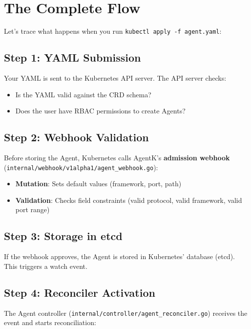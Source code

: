 \documentclass[12pt,a4paper,openany]{report}
\begin{document}
\section{The Complete Flow}

Let's trace what happens when you run \texttt{kubectl apply -f agent.yaml}:

\subsection{Step 1: YAML Submission}

Your YAML is sent to the Kubernetes API server. The API server checks:
\begin{itemize}
    \item Is the YAML valid against the CRD schema?
    \item Does the user have RBAC permissions to create Agents?
\end{itemize}

\subsection{Step 2: Webhook Validation}

Before storing the Agent, Kubernetes calls AgentK's \textbf{admission webhook} (\texttt{internal/webhook/v1alpha1/agent\_webhook.go}):

\begin{itemize}
    \item \textbf{Mutation}: Sets default values (framework, port, path)
    \item \textbf{Validation}: Checks field constraints (valid protocol, valid framework, valid port range)
\end{itemize}

\subsection{Step 3: Storage in etcd}

If the webhook approves, the Agent is stored in Kubernetes' database (etcd). This triggers a watch event.

\subsection{Step 4: Reconciler Activation}

The Agent controller (\texttt{internal/controller/agent\_reconciler.go}) receives the event and starts reconciliation:
\end{document}

